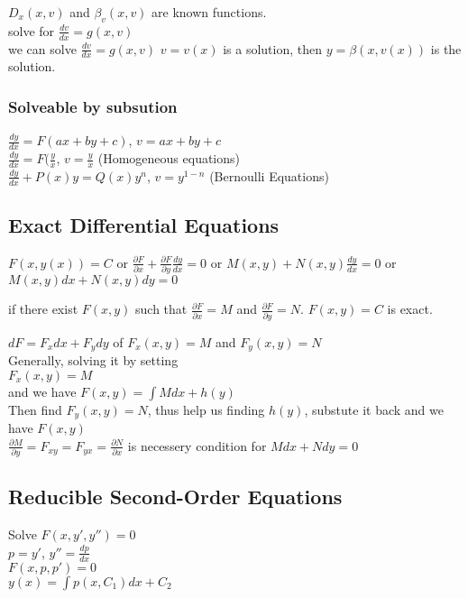 \documentclass[letter]{article}
\begin{document}
$D_x(x,v)$ and $\beta_v(x,v)$ are known functions.\\
solve for $\frac{dv}{dx} = g(x,v)$\\
we can solve $\frac{dv}{dx} = g(x,v)$ $v = v(x)$ is a solution, then $y = \beta(x, v(x))$ is the solution.\\

\subsubsection{Solveable by subsution}
$\frac{dy}{dx} = F(ax+by+c)$, $v = ax+by+c$\\
$\frac{dy}{dx} = F(\frac{y}{x}$, $v = \frac{y}{x}$ (Homogeneous equations)\\
$\frac{dy}{dx} + P(x)y = Q(x) y^n$, $v = y^{1-n}$ (Bernoulli Equations)\\


\subsection{Exact Differential Equations}
$F(x,y(x)) = C$ or $\frac{\partial F}{\partial x} + \frac{\partial F}{\partial y} \frac{dy}{dx} = 0$ or $M(x,y) + N(x,y)\frac{dy}{dx} = 0$
or $M(x,y) dx + N(x,y)dy = 0$

if there exist $F(x,y)$ such that $\frac{\partial F}{\partial x} =M$ and $\frac{\partial F}{\partial y} =N$. $F(x,y) = C$ is exact.

$dF = F_x dx + F_ydy$ of $F_x(x,y) = M$ and $F_y(x,y)=N$\\
Generally, solving it by setting\\
$F_x(x,y) = M$\\
and we have $F(x,y) = \int{ M dx} + h(y)$\\
Then find $F_y(x,y) = N$, thus help us finding $h(y)$, substute it back and we have $F(x,y)$\\
$\frac{\partial M}{\partial y} = F_{xy} = F_{yx} = \frac{\partial N}{\partial x}$ is necessery condition for $Mdx + Ndy = 0$\\

\subsection{Reducible Second-Order Equations}
Solve $F(x,y',y'') = 0$\\
$p = y'$, $y'' = \frac{dp}{dx}$\\
$F(x,p,p')=0$\\
$y(x) = \int{p(x,C_1) dx + C_2}$\\
\end{document}
